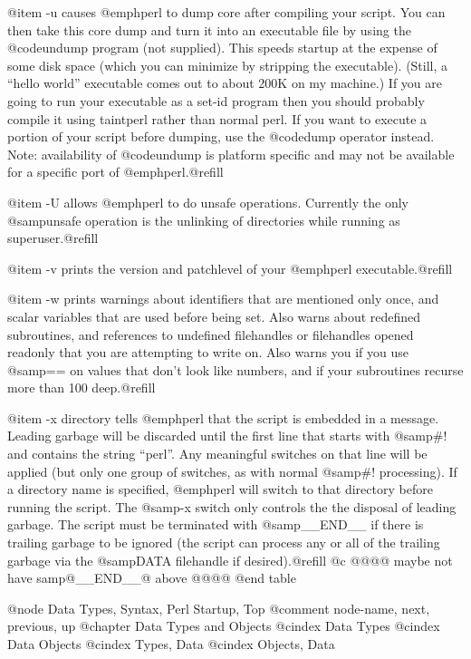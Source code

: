 {{{@item -u
causes @emph{perl} to dump core after compiling your script.  You can
then take this core dump and turn it into an executable file by using
the @code{undump} program (not supplied).  This speeds startup at the
expense of some disk space (which you can minimize by stripping the
executable).  (Still, a ``hello world'' executable comes out to about
200K on my machine.)  If you are going to run your executable as a
set-id program then you should probably compile it using taintperl
rather than normal perl.  If you want to execute a portion of your
script before dumping, use the @code{dump} operator instead.  Note:
availability of @code{undump} is platform specific and may not be
available for a specific port of @emph{perl}.@refill

@item -U
allows @emph{perl} to do unsafe operations.  Currently the only
@samp{unsafe} operation is the unlinking of directories while
running as superuser.@refill

@item -v
prints the version and patchlevel of your @emph{perl} executable.@refill

@item -w
prints warnings about identifiers that are mentioned only once, and
scalar variables that are used before being set.  Also warns about
redefined subroutines, and references to undefined filehandles or
filehandles opened readonly that you are attempting to write on.  Also
warns you if you use @samp{==} on values that don't look like numbers,
and if your subroutines recurse more than 100 deep.@refill

@item -x directory
tells @emph{perl} that the script is embedded in a message.  Leading
garbage will be discarded until the first line that starts with
@samp{#!} and contains the string ``perl''.  Any meaningful switches on
that line will be applied (but only one group of switches, as with
normal @samp{#!} processing).  If a directory name is specified,
@emph{perl} will switch to that directory before running the script.
The @samp{-x} switch only controls the the disposal of leading garbage.
The script must be terminated with @samp{__END__} if there is trailing
garbage to be ignored (the script can process any or all of the trailing
garbage via the @samp{DATA} filehandle if desired).@refill
@c @@@@ maybe not have samp@{__END__@} above @@@@
@end table

@node Data Types, Syntax, Perl Startup, Top
@comment  node-name,  next,  previous,  up
@chapter Data Types and Objects
@cindex Data Types
@cindex Data Objects
@cindex Types, Data
@cindex Objects, Data

}}}
